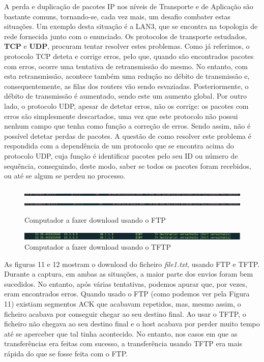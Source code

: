 \documentclass[11pt]{article}
\begin{document}
\vspace{0.5cm}

A perda e duplicação de pacotes IP nos níveis de Transporte e de Aplicação são bastante comuns, tornando-se, cada vez mais, um desafio combater estas situações. Um exemplo desta situação é a LAN3, que se encontra na topologia de rede fornecida junto com o enunciado. Os protocolos de transporte estudados, \textbf{TCP} e \textbf{UDP}, procuram tentar resolver estes problemas.
Como já referimos, o protocolo TCP deteta e corrige erros, pelo que, quando são encontrados pacotes com erros, ocorre uma tentativa de retransmissão do mesmo. No entanto, com esta retransmissão, acontece também uma redução no débito de transmissão e, consequentemente, as filas dos routers vão sendo esvaziadas. Posteriormente, o débito de transmissão é aumentado, sendo este um aumento global.
Por outro lado, o protocolo UDP, apesar de detetar erros, não os corrige: os pacotes com erros são simplesmente descartados, uma vez que este protocolo não possui nenhum campo que tenha como função a correção de erros. Sendo assim, não é possível detetar perdas de pacotes. A questão de como resolver este problema é respondida com a dependência de um protocolo que se encontra acima do protocolo UDP, cuja função é identificar pacotes pelo seu ID ou número de sequência, conseguindo, deste modo, saber se todos os pacotes foram recebidos, ou até se algum se perdeu no processo.

\begin{figure}[hbt!]
    \centering
    \includegraphics[width=1\textwidth]{images/Q4/erroftp.PNG}
    \includegraphics[width=1\textwidth]{images/Q4/erroftp2.PNG}
    \caption{Computador a fazer download usando o FTP}
    \label{fig:my_label}
\end{figure}

\begin{figure}[hbt!]
    \centering
    \includegraphics[width=1\textwidth]{images/Q4/tftp erro.PNG}
    \caption{Computador a fazer download usando o TFTP}
    \label{fig:my_label}
\end{figure}

As figuras 11 e 12 mostram o download do ficheiro \textit{file1.txt}, usando FTP e TFTP. Durante a captura, em ambas as situações, a maior parte dos envios foram bem sucedidos. No entanto, após várias tentativas, podemos apurar que, por vezes, eram encontrados erros. 
Quando usado o FTP (como podemos ver pela Figura 11) existiam segmentos ACK que acabavam repetidos, mas, mesmo assim, o ficheiro acabava por conseguir chegar ao seu destino final. Ao usar o TFTP, o ficheiro não chegava ao seu destino final e o host acabava por perder muito tempo até se aperceber que tal tinha acontecido. No entanto, nos casos em que as transferências era feitas com sucesso, a transferência usando TFTP era mais rápida do que se fosse feita com o FTP.
\end{document}

